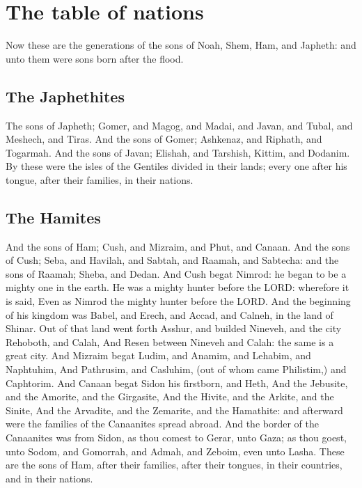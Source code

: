 \section*{The table of nations}
\begin{biblechapter} %
\verse Now these are the generations of the sons of Noah, Shem, Ham, and Japheth: and unto them were sons born after the flood.
\subsection*{The Japhethites}
\verse The sons of Japheth; Gomer, and Magog, and Madai, and Javan, and Tubal, and Meshech, and Tiras.
\verse And the sons of Gomer; Ashkenaz, and Riphath, and Togarmah.
\verse And the sons of Javan; Elishah, and Tarshish, Kittim, and Dodanim.
\verse By these were the isles of the Gentiles divided in their lands; every one after his tongue, after their families, in their nations.
\subsection*{The Hamites}
\verse And the sons of Ham; Cush, and Mizraim, and Phut, and Canaan.
\verse And the sons of Cush; Seba, and Havilah, and Sabtah, and Raamah, and Sabtecha: and the sons of Raamah; Sheba, and Dedan.
\verse And Cush begat Nimrod: he began to be a mighty one in the earth.
\verse He was a mighty hunter before the LORD: wherefore it is said, Even as Nimrod the mighty hunter before the LORD.
\verse And the beginning of his kingdom was Babel, and Erech, and Accad, and Calneh, in the land of Shinar.
\verse Out of that land went forth Asshur, and builded Nineveh, and the city Rehoboth, and Calah,
\verse And Resen between Nineveh and Calah: the same is a great city.
\verse And Mizraim begat Ludim, and Anamim, and Lehabim, and Naphtuhim,
\verse And Pathrusim, and Casluhim, (out of whom came Philistim,) and Caphtorim.
\verse And Canaan begat Sidon his firstborn, and Heth,
\verse And the Jebusite, and the Amorite, and the Girgasite,
\verse And the Hivite, and the Arkite, and the Sinite,
\verse And the Arvadite, and the Zemarite, and the Hamathite: and afterward were the families of the Canaanites spread abroad.
\verse And the border of the Canaanites was from Sidon, as thou comest to Gerar, unto Gaza; as thou goest, unto Sodom, and Gomorrah, and Admah, and Zeboim, even unto Lasha.
\verse These are the sons of Ham, after their families, after their tongues, in their countries, and in their nations.

\end{biblechapter}
